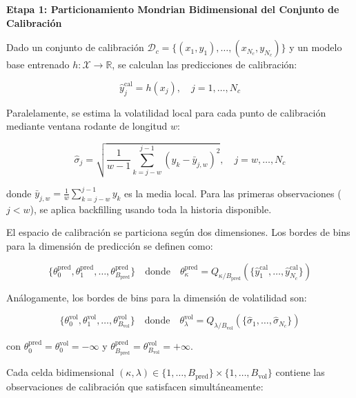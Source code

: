\textbf{Etapa 1: Particionamiento Mondrian Bidimensional del Conjunto de Calibración}

Dado un conjunto de calibración $\mathcal{D}_c = \{(x_1, y_1), \ldots, (x_{N_c}, y_{N_c})\}$ y un modelo base entrenado $h: \mathcal{X} \rightarrow \mathbb{R}$, se calculan las predicciones de calibración:

\begin{equation}
\hat{y}_j^{\text{cal}} = h(x_j), \quad j = 1, \ldots, N_c
\end{equation}

Paralelamente, se estima la volatilidad local para cada punto de calibración mediante ventana rodante de longitud $w$:

\begin{equation}
\hat{\sigma}_j = \sqrt{\frac{1}{w-1} \sum_{k=j-w}^{j-1} (y_k - \bar{y}_{j,w})^2}, \quad j = w, \ldots, N_c
\end{equation}

donde $\bar{y}_{j,w} = \frac{1}{w}\sum_{k=j-w}^{j-1} y_k$ es la media local. Para las primeras observaciones ($j < w$), se aplica backfilling usando toda la historia disponible.

El espacio de calibración se particiona según dos dimensiones. Los bordes de bins para la dimensión de predicción se definen como:

\begin{equation}
\{\theta_0^{\text{pred}}, \theta_1^{\text{pred}}, \ldots, \theta_{B_{\text{pred}}}^{\text{pred}}\} \quad \text{donde} \quad \theta_{\kappa}^{\text{pred}} = Q_{\kappa/B_{\text{pred}}}\left(\{\hat{y}_1^{\text{cal}}, \ldots, \hat{y}_{N_c}^{\text{cal}}\}\right)
\label{eq:avmcps_pred_edges}
\end{equation}

Análogamente, los bordes de bins para la dimensión de volatilidad son:

\begin{equation}
\{\theta_0^{\text{vol}}, \theta_1^{\text{vol}}, \ldots, \theta_{B_{\text{vol}}}^{\text{vol}}\} \quad \text{donde} \quad \theta_{\lambda}^{\text{vol}} = Q_{\lambda/B_{\text{vol}}}\left(\{\hat{\sigma}_1, \ldots, \hat{\sigma}_{N_c}\}\right)
\label{eq:avmcps_vol_edges}
\end{equation}

con $\theta_0^{\text{pred}} = \theta_0^{\text{vol}} = -\infty$ y $\theta_{B_{\text{pred}}}^{\text{pred}} = \theta_{B_{\text{vol}}}^{\text{vol}} = +\infty$. 

Cada celda bidimensional $(\kappa, \lambda) \in \{1, \ldots, B_{\text{pred}}\} \times \{1, \ldots, B_{\text{vol}}\}$ contiene las observaciones de calibración que satisfacen simultáneamente:

